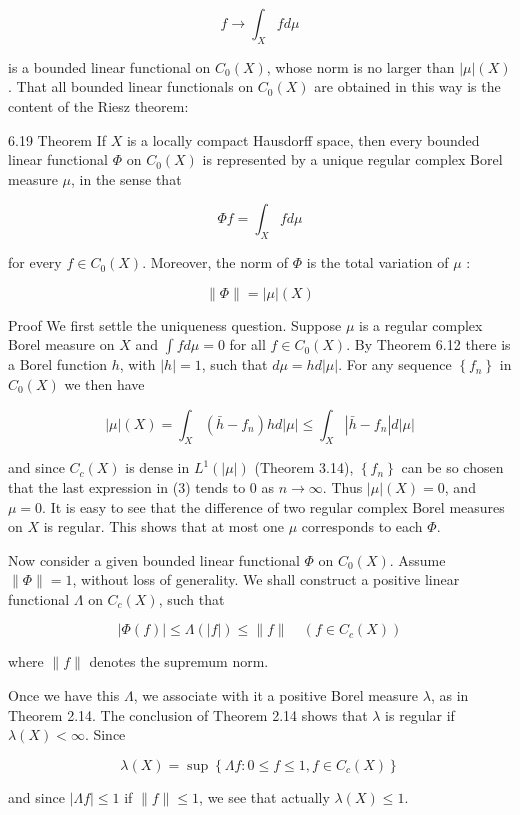 \documentclass[10pt]{article}
\begin{document}
$$
f \rightarrow \int_{X} f d \mu
$$

is a bounded linear functional on $C_{0}(X)$, whose norm is no larger than $|\mu|(X)$. That all bounded linear functionals on $C_{0}(X)$ are obtained in this way is the content of the Riesz theorem:

6.19 Theorem If $X$ is a locally compact Hausdorff space, then every bounded linear functional $\Phi$ on $C_{0}(X)$ is represented by a unique regular complex Borel measure $\mu$, in the sense that

$$
\Phi f=\int_{X} f d \mu
$$

for every $f \in C_{0}(X)$. Moreover, the norm of $\Phi$ is the total variation of $\mu$ :

$$
\|\Phi\|=|\mu|(X)
$$

Proof We first settle the uniqueness question. Suppose $\mu$ is a regular complex Borel measure on $X$ and $\int f d \mu=0$ for all $f \in C_{0}(X)$. By Theorem 6.12 there is a Borel function $h$, with $|h|=1$, such that $d \mu=h d|\mu|$. For any sequence $\left\{f_{n}\right\}$ in $C_{0}(X)$ we then have

$$
|\mu|(X)=\int_{X}\left(\bar{h}-f_{n}\right) h d|\mu| \leq \int_{X}\left|\bar{h}-f_{n}\right| d|\mu|
$$

and since $C_{c}(X)$ is dense in $L^{1}(|\mu|)$ (Theorem 3.14), $\left\{f_{n}\right\}$ can be so chosen that the last expression in (3) tends to 0 as $n \rightarrow \infty$. Thus $|\mu|(X)=0$, and $\mu=0$. It is easy to see that the difference of two regular complex Borel measures on $X$ is regular. This shows that at most one $\mu$ corresponds to each $\Phi$.

Now consider a given bounded linear functional $\Phi$ on $C_{0}(X)$. Assume $\|\Phi\|=1$, without loss of generality. We shall construct a positive linear functional $\Lambda$ on $C_{c}(X)$, such that

$$
|\Phi(f)| \leq \Lambda(|f|) \leq\|f\| \quad\left(f \in C_{c}(X)\right)
$$

where $\|f\|$ denotes the supremum norm.

Once we have this $\Lambda$, we associate with it a positive Borel measure $\lambda$, as in Theorem 2.14. The conclusion of Theorem 2.14 shows that $\lambda$ is regular if $\lambda(X)<\infty$. Since

$$
\lambda(X)=\sup \left\{\Lambda f: 0 \leq f \leq 1, f \in C_{c}(X)\right\}
$$

and since $|\Lambda f| \leq 1$ if $\|f\| \leq 1$, we see that actually $\lambda(X) \leq 1$.
\end{document}
